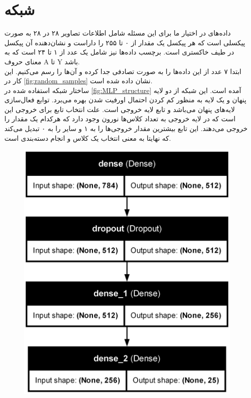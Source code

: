 \documentclass[11pt]{article}
\begin{document}
	\section{شبکه }
	داده‌های در اختیار ما برای این مسئله شامل اطلاعات تصاویر ۲۸ در ۲۸ به صورت پیکسلی است که هر پیکسل یک مقدار از ۰ تا ۲۵۵ را داراست و نشان‌دهنده آن پیکسل در طیف خاکستری است. برچسب داده‌ها نیز شامل یک عدد از ۱ تا ۲۴ است که به معنای حروف A تا Y باشد.\\
	ابتدا ۷ عدد از این داده‌ها را به صورت تصادفی جدا کرده و آن‌ها را رسم می‌کنیم. این کار در 
	\autoref{fig:random_samples}
	نشان داده شده است.\\
	ساختار شبکه  استفاده شده در 
	\autoref{fig:MLP_structure} 
	آمده است. این شبکه از دو لایه پنهان  و یک لایه  به منظور کم کردن احتمال اورفیت شدن بهره می‌برد. توابع فعال‌سازی لایه‌های پنهان  می‌باشد و تابع لایه خروجی  است. علت انتخاب تابع  برای خروجی این است که در لایه خروجی به تعداد کلاس‌ها نورون وجود دارد که هرکدام یک مقدار را خروجی می‌دهند. این تابع بیشترین مقدار خروجی‌ها را به ۱ و سایر را به ۰ تبدیل می‌کند که نهایتا به معنی انتخاب یک کلاس و انجام دسته‌بندی است.
	\begin{figure}[!h]
		\centerline{\includegraphics[width=0.5\linewidth]{../HW3_1/model_structure.png}}
		\caption{}
		\label{fig:MLP_structure}
	\end{figure}\\
\end{document}

